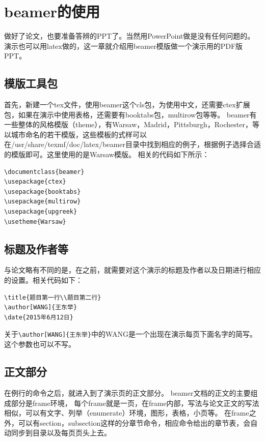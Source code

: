 \chapter{beamer的使用}


做好了论文，也要准备答辨的PPT了。当然用PowerPoint做是没有任何问题的。
演示也可以用latex做的，这一章就介绍用beamer模版做一个演示用的PDF版PPT。

\section{模版工具包}

首先，新建一个tex文件，使用beamer这个cls包，为使用中文，还需要ctex扩展包，如果在演示中使用表格，还需要有booktabs包，multirow包等等。
beamer有一些整体的风格模版（theme），有Warsaw，Madrid，Pittsburgh，Rochester，等以城市命名的若干模版，这些模板的式样可以在/usr/share/texmf/doc/latex/beamer目录中找到相应的例子，根据例子选择合适的模版即可。这里使用的是Warsaw模版。
相关的代码如下所示：

{
\linespread{1}
\noindent
\begin{verbatim}
\documentclass{beamer}
\usepackage{ctex}
\usepackage{booktabs}
\usepackage{multirow}
\usepackage{upgreek}
\usetheme{Warsaw}
\end{verbatim}
}

\section{标题及作者等}

与论文略有不同的是，在\verb++之前，就需要对这个演示的标题及作者以及日期进行相应的设置。相关代码如下：

{
\linespread{1}
\noindent
\begin{verbatim}
\title{题目第一行\\题目第二行}
\author[WANG]{王东举}
\date{2015年6月12日}
\end{verbatim}
}

关于\verb|\author[WANG]{王东举}|中的WANG是一个出现在演示每页下面名字的简写。这个参数也可以不写。

\section{正文部分}

在例行的\verb||命令之后，就进入到了演示页的正文部分。
beamer文档的正文的主要组成部分是frame环境，
每个frame就是一页，在frame内部，写法与论文正文的写法相似，可以有文字、列举（enumerate）环境，图形，表格，小页等。
在frame之外，可以有section，subsection这样的分章节命令，相应命令给出的章节表，会自动同步到目录以及每页页头上去。

